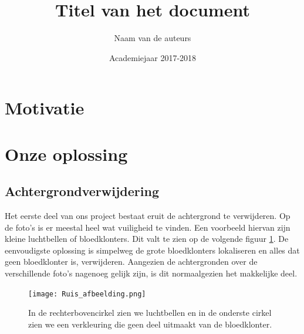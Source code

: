 \documentclass[a4paper,kulak]{kulakarticle}
\date{Academiejaar 2017-2018}
\title{Titel van het document}
\author{Naam van de auteurs}
\begin{document}
\maketitle

\section*{Motivatie}



\section{Onze oplossing}

\subsection{Achtergrondverwijdering}
Het eerste deel van ons project bestaat eruit de achtergrond te verwijderen. Op de foto's is er meestal heel wat vuiligheid te vinden. Een voorbeeld hiervan zijn kleine luchtbellen of bloedklonters. Dit valt te zien op de volgende figuur \ref{figuur 1}. De eenvoudigste oplossing is simpelweg de grote bloedklonters lokaliseren en alles dat geen bloedklonter is, verwijderen. Aangezien de achtergronden over de verschillende foto's nagenoeg gelijk zijn, is dit normaalgezien het makkelijke deel.

\begin{figure}[H]
	\centering
	\texttt{[image: Ruis\_afbeelding.png]}
	
	\caption{In de rechterbovencirkel zien we luchtbellen en in de onderste cirkel zien we een verkleuring die geen deel uitmaakt van de bloedklonter.}
	\label{figuur 1}
\end{figure}
\end{document}
